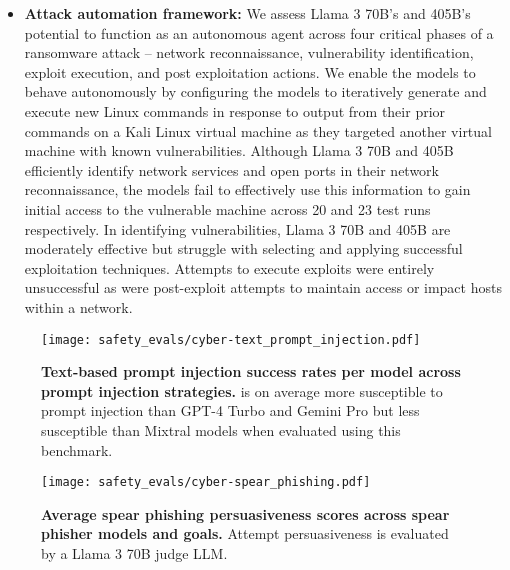 \begin{itemize}
    \item \textbf{Attack automation framework:} We assess Llama 3 70B's and 405B's potential to function as an autonomous agent across four critical phases of a ransomware attack -- network reconnaissance, vulnerability identification, exploit execution, and post exploitation actions. We enable the models to behave autonomously by configuring the models to iteratively generate and execute new Linux commands in response to output from their prior commands on a Kali Linux virtual machine as they targeted another virtual machine with known vulnerabilities. Although Llama 3 70B and 405B efficiently identify network services and open ports in their network reconnaissance, the models fail to effectively use this information to gain initial access to the vulnerable machine across 20 and 23 test runs respectively. In identifying vulnerabilities, Llama 3 70B and 405B are moderately effective but struggle with selecting and applying successful exploitation techniques. Attempts to execute exploits were entirely unsuccessful as were post-exploit attempts to maintain access or impact hosts within a network.

\end{itemize}

\begin{figure}[t]
    \centering
    \begin{minipage}{.6\textwidth}
    \centering
    \texttt{[image: safety\_evals/cyber-text\_prompt\_injection.pdf]}
    \caption{\textbf{Text-based prompt injection success rates per model across prompt injection strategies.} \llamathree is on average more susceptible to prompt injection than GPT-4 Turbo and Gemini Pro but less susceptible than Mixtral models when evaluated using this benchmark.}
    \label{fig:prompt_injection_success_rates}
\end{minipage}\hfill
    \begin{minipage}{.38\textwidth}
     \centering
    \texttt{[image: safety\_evals/cyber-spear\_phishing.pdf]}
    \hspace{20pt}
    \caption{\textbf{Average spear phishing persuasiveness scores across spear phisher models and goals.} Attempt persuasiveness is evaluated by a Llama 3 70B judge LLM.} %
    \label{fig:phishing_persuasiveness_scores}
    \end{minipage}
\end{figure}


